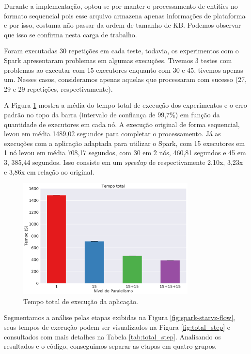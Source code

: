 Durante a implementação, optou-se por manter o processamento de entities
no formato sequencial pois esse arquivo armazena apenas informações de 
plataforma e por isso, costuma não passar da ordem de tamanho de KB. Podemos 
observar que isso se confirma nesta carga de trabalho.


Foram executadas 30 repetições em cada teste, todavia, os experimentos com o 
Spark apresentaram problemas em algumas execuções. Tivemos 3 testes com 
problemas ao executar com 15 executores enquanto com 30 e 45, tivemos apenas 
um. Nesses casos, consideramos apenas aquelas que processaram com sucesso (27, 
29 e 29 repetições, respectivamente). 

A Figura \ref{fig:total_full} mostra a média do tempo total de execução dos 
experimentos e o erro padrão no topo da barra (intervalo de confiança 
de 99,7\%) em função da quantidade de executores em cada nó. A execução original 
de forma sequencial, levou em média 1489,02 segundos para completar o 
processamento. Já as execuções com a aplicação adaptada para utilizar o Spark, 
com 15 executores em 1 nó levou em média 708,17 segundos, com 30 em 2 nós, 
460,81 segundos e 45 em 3, 385,44 segundos. Isso consiste em um \textit{speedup} 
de respectivamente 2,10x, 3,23x e 3,86x em relação ao original.

\begin{figure}[ht]
\centerline{
\includegraphics[width=0.8\textwidth]{./img/total.pdf}}
 \caption{Tempo total de execução da aplicação.}
 \label{fig:total_full}
\end{figure}


Segmentamos a análise pelas etapas exibidas na Figura 
\ref{fig:spark-starvz-flow}, seus tempos de execução podem ser visualizados na 
Figura \ref{fig:total_step} e consultados com mais detalhes na Tabela 
\ref{tab:total_step}. Analisando os resultados e o código, conseguimos 
separar as etapas em quatro grupos.

